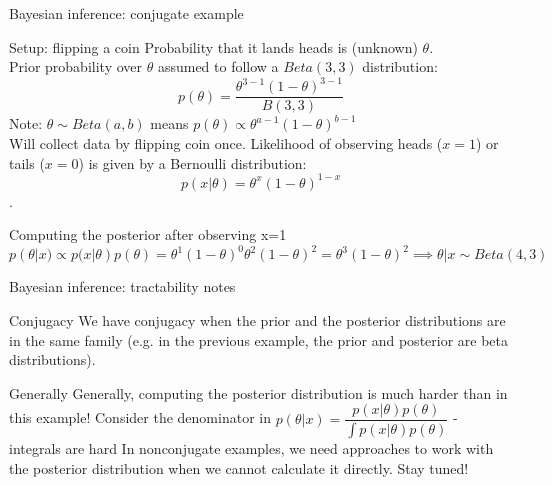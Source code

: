 \documentclass[10pt]{beamer}
\begin{document}
\begin{frame}{Bayesian inference: conjugate example}

\begin{sblock}{Setup: flipping a coin}
Probability that it lands heads is (unknown) $\theta$. \\
Prior probability over $\theta$ assumed to follow a $Beta(3,3)$ distribution:
$$ p(\theta) = \frac{\theta^{3-1}(1-\theta)^{3-1}}{B(3,3)}$$
Note: $\theta \sim Beta(a, b)$ means $p(\theta) \propto \theta^{a-1}(1-\theta)^{b-1}$\\
Will collect data by flipping coin once. Likelihood of observing heads ($x=1$) or tails ($x=0$) is given by a Bernoulli distribution:
$$p(x | \theta) = \theta^x(1-\theta)^{1-x} $$.
\end{sblock}
\begin{sblock}{Computing the posterior after observing x=1}
$$p(\theta| x) \propto p(x | \theta) p(\theta) = \theta^1(1-\theta)^{0}  \theta^{2}(1-\theta)^{2}  = \theta^3 (1-\theta)^2 \implies \theta | x \sim Beta(4,3)$$
\end{sblock}

\end{frame}


\begin{frame}{Bayesian inference: tractability notes}

\begin{sblock}{Conjugacy}
We have conjugacy when the prior and the posterior distributions are in the same family (e.g. in the previous example, the prior and posterior are beta distributions).
\end{sblock}

\begin{sblock}{Generally}
Generally, computing the posterior distribution is much harder than in this example!
\vfill
Consider the denominator in $ p(\theta | x) = \dfrac{p(x | \theta) p(\theta)}{\int p(x | \theta) p(\theta)}  $  - integrals are hard 
\vfill
In nonconjugate examples, we need approaches to work with the posterior distribution when we cannot calculate it directly. Stay tuned!
\end{sblock}

\end{frame}




\end{document}
